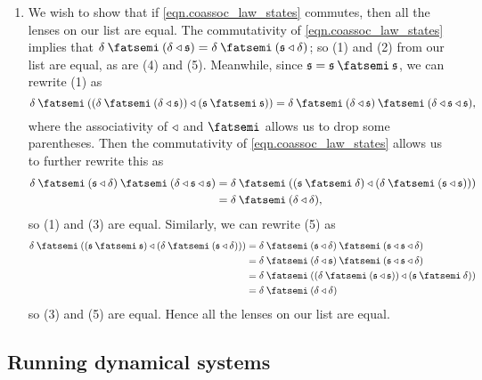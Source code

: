 \documentclass[Book-Poly]{subfiles}
\begin{document}
\begin{exercise}
\begin{solution}
\begin{enumerate}
    \item We wish to show that if \eqref{eqn.coassoc_law_states} commutes, then all the lenses on our list are equal.
    The commutativity of \eqref{eqn.coassoc_law_states} implies that $\delta\then(\delta\tri\car{s})=\delta\then(\car{s}\tri\delta)$; so (1) and (2) from our list are equal, as are (4) and (5).
    Meanwhile, since $\car{s}=\car{s}\then\car{s}$, we can rewrite (1) as
    \[
        \delta\then((\delta\then(\delta\tri\car{s}))\tri(\car{s}\then\car{s}))=\delta\then(\delta\tri\car{s})\then(\delta\tri\car{s}\tri\car{s}),
    \]
    where the associativity of $\mathbin{\triangleleft}$ and $\then$ allows us to drop some parentheses.
    Then the commutativity of \eqref{eqn.coassoc_law_states} allows us to further rewrite this as
    \begin{align*}
        \delta\then(\car{s}\tri\delta)\then(\delta\tri\car{s}\tri\car{s})&=\delta\then((\car{s}\then\delta)\tri(\delta\then(\car{s}\tri\car{s})))\\
        &=\delta\then(\delta\tri\delta),
    \end{align*}
    so (1) and (3) are equal.
    Similarly, we can rewrite (5) as
    \begin{align*}
        \delta\then((\car{s}\then\car{s})\tri(\delta\then(\car{s}\tri\delta)))&=\delta\then(\car{s}\tri\delta)\then(\car{s}\tri\car{s}\tri\delta)\\
        &=\delta\then(\delta\tri\car{s})\then(\car{s}\tri\car{s}\tri\delta)\\
        &=\delta\then((\delta\then(\car{s}\tri\car{s}))\tri(\car{s}\then\delta))\\
        &=\delta\then(\delta\tri\delta)
    \end{align*}
    so (3) and (5) are equal.
    Hence all the lenses on our list are equal.
\end{enumerate}
\end{solution}
\end{exercise}

\subsection{Running dynamical systems}\label{subsec.comon.sharp.state.run}
\end{document}
